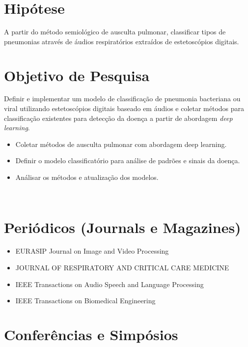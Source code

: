 \documentclass[letterpaper, 10 pt, conference]{ieeeconf}  %
\begin{document}
\section{Hipótese}

A partir do método semiológico de ausculta pulmonar, classificar tipos de pneumonias através de áudios respiratórios extraídos de estetoscópios digitais.


\section{Objetivo de Pesquisa}

Definir e implementar um modelo de classificação de pneumonia bacteriana ou viral utilizando estetoscópios digitais baseado em áudios e coletar métodos para classificação existentes para detecção da doença a partir de abordagem \textit{deep learning}.

\begin{itemize}
\item Coletar métodos de ausculta pulmonar com abordagem deep learning.

\item Definir o modelo classificatório para análise de padrões e sinais da doença.

\item Análisar os métodos e atualização dos modelos.

\end{itemize}
\ \\

\section{Periódicos (Journals e Magazines)}
\begin{itemize}
\item EURASIP Journal on Image and Video Processing
\item JOURNAL OF RESPIRATORY AND CRITICAL CARE MEDICINE
\item IEEE Transactions on Audio Speech and Language Processing
\item IEEE Transactions on Biomedical Engineering
\ \\

\end{itemize}
\section{Conferências e Simpósios}
\end{document}
